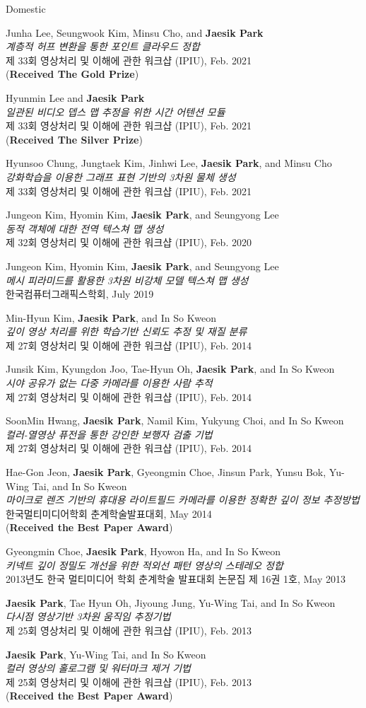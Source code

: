 \documentclass[letterpaper,11pt]{article}
\newcommand{\publicationItem}[4]{
  \small{
  \item{#1\\ \emph{#2}\\ #3\\ #4}
  }
}
\newcommand{\resumePublicationListStart}{\begin{enumerate}[leftmargin=0.5in, label={[\arabic*]}]}
\newcommand{\resumePublicationListEnd}{\end{enumerate}\vspace{-5pt}}
\begin{document}
Domestic
\resumePublicationListStart
    \publicationItem{Junha Lee, Seungwook Kim, Minsu Cho, and \textbf{Jaesik Park}}{계층적 허프 변환을 통한 포인트 클라우드 정합}{제 33회 영상처리 및 이해에 관한 워크샵 (IPIU), Feb. 2021}{(\textbf{Received The Gold Prize})}
    \publicationItem{Hyunmin Lee and \textbf{Jaesik Park}}{일관된 비디오 뎁스 맵 추정을 위한 시간 어텐션 모듈}{제 33회 영상처리 및 이해에 관한 워크샵 (IPIU), Feb. 2021}{(\textbf{Received The Silver Prize})}
    \publicationItem{Hyunsoo Chung, Jungtaek Kim, Jinhwi Lee, \textbf{Jaesik Park}, and Minsu Cho}{강화학습을 이용한 그래프 표현 기반의 3차원 물체 생성}{제 33회 영상처리 및 이해에 관한 워크샵 (IPIU), Feb. 2021}{}
    \publicationItem{Jungeon Kim, Hyomin Kim, \textbf{Jaesik Park}, and Seungyong Lee}{동적 객체에 대한 전역 텍스쳐 맵 생성}{제 32회 영상처리 및 이해에 관한 워크샵 (IPIU), Feb. 2020}{}
    \publicationItem{Jungeon Kim, Hyomin Kim, \textbf{Jaesik Park}, and Seungyong Lee}{메시 피라미드를 활용한 3차원 비강체 모델 텍스쳐 맵 생성}{한국컴퓨터그래픽스학회, July 2019}{}
    \publicationItem{Min-Hyun Kim, \textbf{Jaesik Park}, and In So Kweon}{깊이 영상 처리를 위한 학습기반 신뢰도 추정 및 재질 분류}{제 27회 영상처리 및 이해에 관한 워크샵 (IPIU), Feb. 2014}{}
    \publicationItem{Junsik Kim, Kyungdon Joo, Tae-Hyun Oh, \textbf{Jaesik Park}, and In So Kweon}{시야 공유가 없는 다중 카메라를 이용한 사람 추적}{제 27회 영상처리 및 이해에 관한 워크샵 (IPIU), Feb. 2014}{}
    \publicationItem{SoonMin Hwang, \textbf{Jaesik Park}, Namil Kim, Yukyung Choi, and In So Kweon}{컬러-열영상 퓨전을 통한 강인한 보행자 검출 기법}{제 27회 영상처리 및 이해에 관한 워크샵 (IPIU), Feb. 2014}{}
    \publicationItem{Hae-Gon Jeon, \textbf{Jaesik Park}, Gyeongmin Choe, Jinsun Park, Yunsu Bok, Yu-Wing Tai, and In So Kweon}{마이크로 렌즈 기반의 휴대용 라이트필드 카메라를 이용한 정확한 깊이 정보 추정방법}{한국멀티미디어학회 춘계학술발표대회, May 2014}{(\textbf{Received the Best Paper Award})}
    \publicationItem{Gyeongmin Choe, \textbf{Jaesik Park}, Hyowon Ha, and In So Kweon}{키넥트 깊이 정밀도 개선을 위한 적외선 패턴 영상의 스테레오 정합}{2013년도 한국 멀티미디어 학회 춘계학술 발표대회 논문집 제 16권 1호, May 2013}{}
    \publicationItem{\textbf{Jaesik Park}, Tae Hyun Oh, Jiyoung Jung, Yu-Wing Tai, and In So Kweon}{다시점 영상기반 3차원 움직임 추정기법}{제 25회 영상처리 및 이해에 관한 워크샵 (IPIU), Feb. 2013}{}
    \publicationItem{\textbf{Jaesik Park}, Yu-Wing Tai, and In So Kweon}{컬러 영상의 홀로그램 및 워터마크 제거 기법}{제 25회 영상처리 및 이해에 관한 워크샵 (IPIU), Feb. 2013}{(\textbf{Received the Best Paper Award})}
\resumePublicationListEnd
\end{document}
